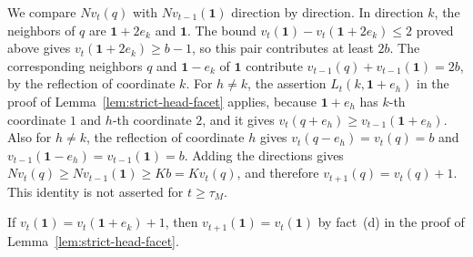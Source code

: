 \documentclass[12pt]{amsart}
\begin{document}
We compare $Nv_t(q)$ with $Nv_{t-1}(\mathbf{1})$ direction by direction. In direction $k$, the neighbors of $q$ are $\mathbf{1}+2e_k$ and $\mathbf{1}$. The bound $v_t(\mathbf{1})-v_t(\mathbf{1}+2e_k)\leq2$ proved above gives $v_t(\mathbf{1}+2e_k)\geq b-1$, so this pair contributes at least $2b$. The corresponding neighbors $q$ and $\mathbf{1}-e_k$ of $\mathbf{1}$ contribute $v_{t-1}(q)+v_{t-1}(\mathbf{1})=2b$, by the reflection of coordinate $k$. For $h\neq k$, the assertion $L_t(k,\mathbf{1}+e_h)$ in the proof of Lemma~\ref{lem:strict-head-facet} applies, because $\mathbf{1}+e_h$ has $k$-th coordinate $1$ and $h$-th coordinate $2$, and it gives $v_t(q+e_h)\geq v_{t-1}(\mathbf{1}+e_h)$. Also for $h\neq k$, the reflection of coordinate $h$ gives $v_t(q-e_h)=v_t(q)=b$ and $v_{t-1}(\mathbf{1}-e_h)=v_{t-1}(\mathbf{1})=b$. Adding the directions gives $Nv_t(q)\geq Nv_{t-1}(\mathbf{1})\geq Kb=Kv_t(q)$, and therefore $v_{t+1}(q)=v_t(q)+1$. This identity is not asserted for $t\geq\tau_M$.

If $v_t(\mathbf{1})=v_t(\mathbf{1}+e_k)+1$, then $v_{t+1}(\mathbf{1})=v_t(\mathbf{1})$ by fact~(d) in the proof of Lemma~\ref{lem:strict-head-facet}.
\end{document}
